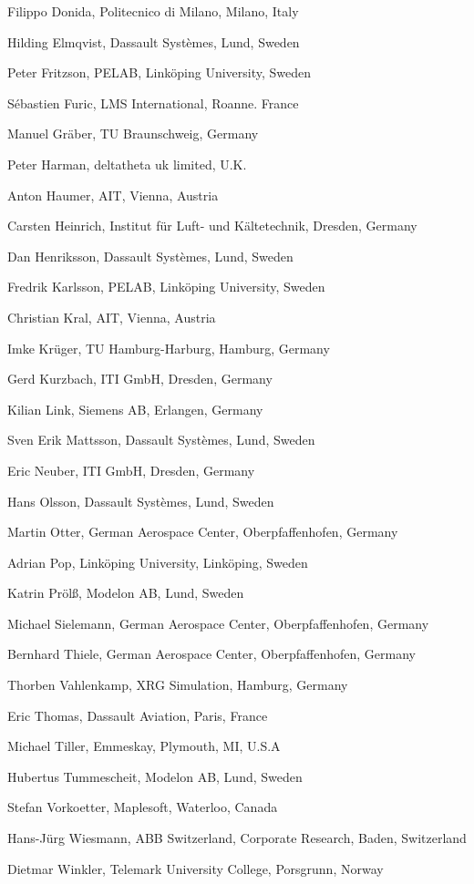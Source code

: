 \documentclass[10pt,a4paper]{report}
\begin{document}
Filippo Donida, Politecnico di Milano, Milano, Italy

Hilding Elmqvist, Dassault Systèmes, Lund, Sweden

Peter Fritzson, PELAB, Linköping University, Sweden

Sébastien Furic, LMS International, Roanne. France

Manuel Gräber, TU Braunschweig, Germany

Peter Harman, deltatheta uk limited, U.K.

Anton Haumer, AIT, Vienna, Austria

Carsten Heinrich, Institut für Luft- und Kältetechnik, Dresden, Germany

Dan Henriksson, Dassault Systèmes, Lund, Sweden

Fredrik Karlsson, PELAB, Linköping University, Sweden

Christian Kral, AIT, Vienna, Austria

Imke Krüger, TU Hamburg-Harburg, Hamburg, Germany

Gerd Kurzbach, ITI GmbH, Dresden, Germany

Kilian Link, Siemens AB, Erlangen, Germany

Sven Erik Mattsson, Dassault Systèmes, Lund, Sweden

Eric Neuber, ITI GmbH, Dresden, Germany

Hans Olsson, Dassault Systèmes, Lund, Sweden

Martin Otter, German Aerospace Center, Oberpfaffenhofen, Germany

Adrian Pop, Linköping University, Linköping, Sweden

Katrin Prölß, Modelon AB, Lund, Sweden

Michael Sielemann, German Aerospace Center, Oberpfaffenhofen, Germany

Bernhard Thiele, German Aerospace Center, Oberpfaffenhofen, Germany

Thorben Vahlenkamp, XRG Simulation, Hamburg, Germany

Eric Thomas, Dassault Aviation, Paris, France

Michael Tiller, Emmeskay, Plymouth, MI, U.S.A

Hubertus Tummescheit, Modelon AB, Lund, Sweden

Stefan Vorkoetter, Maplesoft, Waterloo, Canada

Hans-Jürg Wiesmann, ABB Switzerland, Corporate Research, Baden,
Switzerland

Dietmar Winkler, Telemark University College, Porsgrunn, Norway
\end{document}
